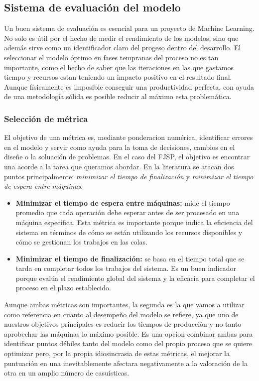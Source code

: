 \subsection{Sistema de evaluación del modelo}
Un buen sistema de evaluación es esencial para un proyecto de Machine Learning.
No solo es útil por el hecho de medir el rendimiento de los modelos,
sino que además sirve como un identificador claro del progeso dentro del desarrollo.
El seleccionar el modelo óptimo en fases tempranas del proceso no es tan importante,
como el hecho de saber que las iteraciones en las que gastamos tiempo y recursos estan teniendo un impacto
positivo en el resultado final. Aunque físicamente es imposible conseguir una productividad
perfecta, con ayuda de una metodología sólida es posible reducir al máximo esta problemática.

\subsubsection{Selección de métrica}
El objetivo de una métrica es, mediante ponderacion numérica, identificar errores en el modelo y
servir como ayuda para la toma de decisiones, cambios en el diseñe o la soluación de problemas. En el caso del
FJSP, el objetivo es encontrar una acorde a la tarea que queramos abordar. En la literatura se atacan dos puntos
principalmente: \textit{minimizar el tiempo de finalización} y \textit{minimizar el tiempo de espera entre máquinas}.

\begin{itemize}
    \item \textbf{Minimizar el tiempo de espera entre máquinas:} mide el tiempo promedio que cada operación debe
          esperar antes de ser procesado en una máquina específica. Esta métrica es importante porque
          indica la eficiencia del sistema en términos de cómo se están utilizando los recursos disponibles
          y cómo se gestionan los trabajos en las colas.
    \item \textbf{Minimizar el tiempo de finalización:} se basa en el tiempo total que se tarda en completar todos
          los trabajos del sistema. Es un buen indicador porque evalúa el rendimiento global del sistema
          y la eficacia para completar el proceso en el plazo establecido.
\end{itemize}

Aunque ambas métricas son importantes, la segunda es la que vamos a utilizar como referencia en cuanto al
desempeño del modelo se refiere, ya que uno de nuestros objetivos principales es reducir los tiempos de producción y no tanto
aprobechar las máquinas lo máximo posible. Es una opcion combinar ambas para identificar puntos débiles tanto del modelo
como del propio proceso que se quiere optimizar pero, por la propia idiosincrasia de estas métricas, el mejorar la puntuación
en una inevitablemente afectara negativamente a la valoración de la otra en un amplio número de casuísticas.

